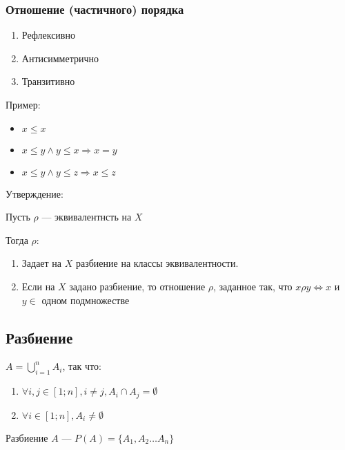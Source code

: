 \documentclass{article}
\begin{document}
\subsubsection{Отношение (частичного) порядка}

\begin{enumerate}
	\item Рефлексивно
	\item Антисимметрично
	\item Транзитивно
\end{enumerate}

Пример:

\begin{itemize}
	\item $x \le x$
	\item $x \le y \land y \le x \Rightarrow x = y$
	\item $x \le y \land y \le z \Rightarrow x \le z$
\end{itemize}

{\Large Утверждение:}

Пусть $\rho$ --- эквивалентнсть на $X$

Тогда $\rho$:

\begin{enumerate}
	\item Задает на $X$ разбиение на классы эквивалентности.
	\item Если на $X$ задано разбиение, то отношение $\rho$, заданное так, что $x \rho y \Leftrightarrow x$ и $y \in$ одном подмножестве
\end{enumerate}

\subsection{Разбиение}

$A = \bigcup \limits_{i = 1}^n A_i$, так что:

\begin{enumerate}
	\item $\forall i, j \in [1; n], i \ne j, A_i \cap A_j = \emptyset$
	\item $\forall i \in [1; n], A_i \ne \emptyset$
\end{enumerate}

Разбиение $A$ --- $P(A) = \{A_1, A_2 \dots A_n\}$
\end{document}
